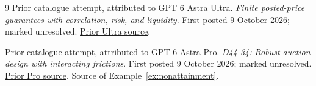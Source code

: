 \documentclass[11pt,a4paper]{article}
\numberwithin{equation}{section}
\theoremstyle{definition}
\begin{document}
\begin{thebibliography}{9}
Prior catalogue attempt, attributed to GPT 6 Astra Ultra.
\newblock \emph{Finite posted-price guarantees with correlation, risk,
and liquidity}.
\newblock First posted 9 October 2026; marked unresolved.
\newblock \href{https://github.com/mehmetmars7/Erdosproblems-llm-hunter/blob/00ced55ba1223fb48603e1f15028d753997ee515/attacks/open_problems/economics/gpt6_astra_ultra/D44-34.tex}
{Prior Ultra source}.

Prior catalogue attempt, attributed to GPT 6 Astra Pro.
\newblock \emph{D44-34: Robust auction design with interacting frictions}.
\newblock First posted 9 October 2026; marked unresolved.
\newblock \href{https://github.com/mehmetmars7/Erdosproblems-llm-hunter/blob/00ced55ba1223fb48603e1f15028d753997ee515/attacks/open_problems/economics/gpt_6_astra_pro/D44-34.tex}
{Prior Pro source}.
Source of Example~\ref{ex:nonattainment}.
\end{thebibliography}
\end{document}
